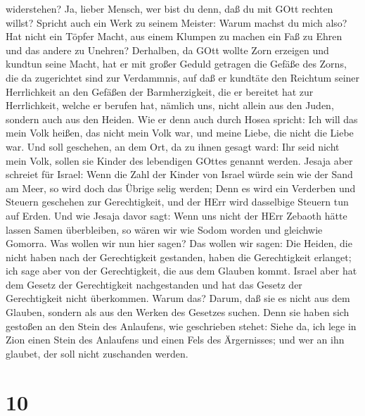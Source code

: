 widerstehen?  Ja, lieber Mensch, wer bist du denn, daß du
mit GOtt rechten willst? Spricht auch ein Werk zu seinem Meister: Warum
machst du mich also?  Hat nicht ein Töpfer Macht, aus einem
Klumpen zu machen ein Faß zu Ehren und das andere zu Unehren?
 Derhalben, da GOtt wollte Zorn erzeigen und kundtun seine
Macht, hat er mit großer Geduld getragen die Gefäße des Zorns, die da
zugerichtet sind zur Verdammnis,  auf daß er kundtäte den
Reichtum seiner Herrlichkeit an den Gefäßen der Barmherzigkeit, die er
bereitet hat zur Herrlichkeit,  welche er berufen hat,
nämlich uns, nicht allein aus den Juden, sondern auch aus den Heiden.
 Wie er denn auch durch Hosea spricht: Ich will das mein
Volk heißen, das nicht mein Volk war, und meine Liebe, die nicht die
Liebe war.  Und soll geschehen, an dem Ort, da zu ihnen
gesagt ward: Ihr seid nicht mein Volk, sollen sie Kinder des lebendigen
GOttes genannt werden.  Jesaja aber schreiet für Israel:
Wenn die Zahl der Kinder von Israel würde sein wie der Sand am Meer, so
wird doch das Übrige selig werden;  Denn es wird ein
Verderben und Steuern geschehen zur Gerechtigkeit, und der HErr wird
dasselbige Steuern tun auf Erden.  Und wie Jesaja davor
sagt: Wenn uns nicht der HErr Zebaoth hätte lassen Samen überbleiben, so
wären wir wie Sodom worden und gleichwie Gomorra.  Was
wollen wir nun hier sagen? Das wollen wir sagen: Die Heiden, die nicht
haben nach der Gerechtigkeit gestanden, haben die Gerechtigkeit
erlanget; ich sage aber von der Gerechtigkeit, die aus dem Glauben
kommt.  Israel aber hat dem Gesetz der Gerechtigkeit
nachgestanden und hat das Gesetz der Gerechtigkeit nicht überkommen.
 Warum das? Darum, daß sie es nicht aus dem Glauben,
sondern als aus den Werken des Gesetzes suchen. Denn sie haben sich
gestoßen an den Stein des Anlaufens,  wie geschrieben
stehet: Siehe da, ich lege in Zion einen Stein des Anlaufens und einen
Fels des Ärgernisses; und wer an ihn glaubet, der soll nicht zuschanden
werden.

\hypertarget{section-9}{%
\section{10}\label{section-9}}

